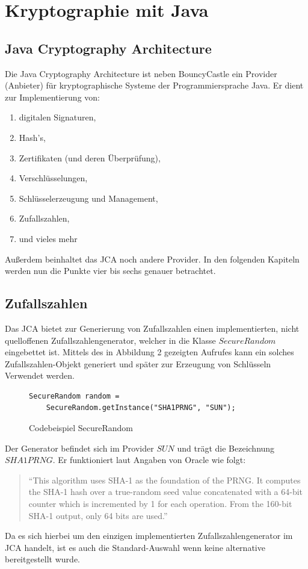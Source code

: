 \documentclass[paper=a4,11pt,german]{scrartcl} %
\begin{document}
\section{Kryptographie mit Java}

\subsection{Java Cryptography Architecture}
Die Java Cryptography Architecture ist neben BouncyCastle ein Provider (Anbieter) für kryptographische Systeme der Programmiersprache Java.
Er dient zur Implementierung von:
\begin{enumerate}
\item digitalen Signaturen,
\item Hash's,
\item Zertifikaten (und deren Überprüfung),
\item Verschlüsselungen,
\item Schlüsselerzeugung und Management,
\item Zufallszahlen,
\item und vieles mehr \cite{JCAdoc}
\end{enumerate}
Außerdem beinhaltet das JCA noch andere Provider.
In den folgenden Kapiteln werden nun die Punkte vier bis sechs genauer betrachtet. 
 
\subsection{Zufallszahlen}
Das JCA bietet zur Generierung von Zufallszahlen einen implementierten, nicht quelloffenen Zufallszahlengenerator, welcher in die Klasse
$SecureRandom$ eingebettet ist. Mittels des in Abbildung 2 gezeigten Aufrufes kann ein solches Zufallszahlen-Objekt generiert und später zur Erzeugung von Schlüsseln Verwendet werden.

\begin{figure}[hbtp]
\caption{Codebeispiel SecureRandom}
\begin{lstlisting}[frame=shadowbox]
SecureRandom random =
	SecureRandom.getInstance("SHA1PRNG", "SUN");
\end{lstlisting}

\label{SecureRandom}
\end{figure}
Der Generator befindet sich im Provider $SUN$ und trägt die Bezeichnung $SHA1PRNG$. Er funktioniert laut Angaben von Oracle wie folgt:  
\begin{quote}
``This algorithm uses SHA-1 as the foundation of the PRNG.
It computes the SHA-1 hash over a true-random seed value
 concatenated with a 64-bit counter which is incremented 
 by 1 for each operation. From the 160-bit SHA-1 output, only 64 bits are used.'' \cite{Oracle}
\end{quote}
Da es sich hierbei um den einzigen implementierten Zufallszahlengenerator im JCA handelt, ist es auch die Standard-Auswahl wenn keine alternative bereitgestellt wurde.
\end{document}
